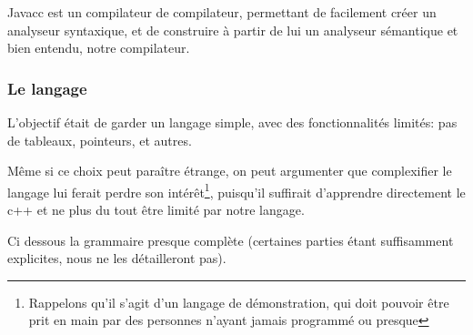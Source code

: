 \documentclass[a4paper,11pt]{article}
\begin{document}
        Javacc est un compilateur de compilateur, permettant de facilement créer un analyseur syntaxique, et de construire à partir de lui un analyseur sémantique et bien entendu, notre compilateur.

    \subsubsection{Le langage}
        L'objectif était de garder un langage simple, avec des fonctionnalités limités: pas de tableaux, pointeurs, et autres.

        Même si ce choix peut paraître étrange, on peut argumenter que complexifier le langage lui ferait perdre son intérêt\footnote{Rappelons qu'il s'agit d'un langage de démonstration, qui doit pouvoir être prit en main par des personnes n'ayant jamais programmé ou presque}, puisqu'il suffirait d'apprendre directement le c++ et ne plus du tout être limité par notre langage.
        
        Ci dessous la grammaire presque complète (certaines parties étant suffisamment explicites, nous ne les détailleront pas).
\end{document}
